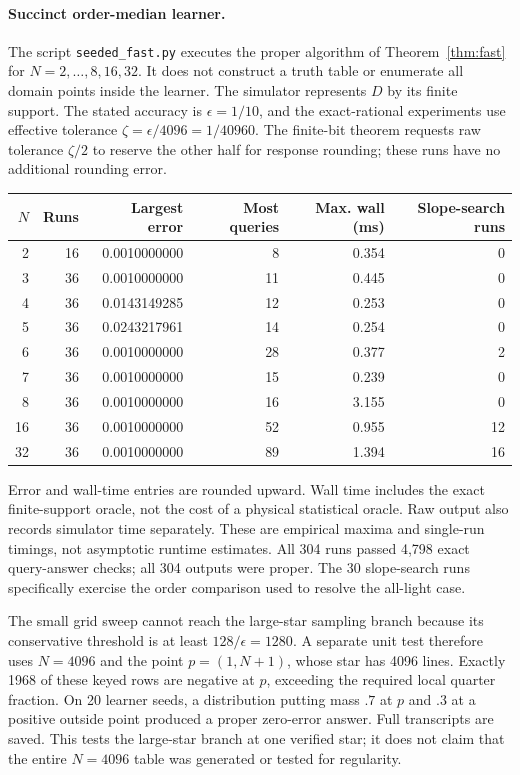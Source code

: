 \paragraph{Succinct order-median learner.}
The script \texttt{seeded\_fast.py} executes the proper algorithm of Theorem~\ref{thm:fast} for $N=2,\ldots,8,16,32$. It does not construct a truth table or enumerate all domain points inside the learner. The simulator represents $D$ by its finite support. The stated accuracy is $\epsilon=1/10$, and the exact-rational experiments use effective tolerance $\zeta=\epsilon/4096=1/40960$. The finite-bit theorem requests raw tolerance $\zeta/2$ to reserve the other half for response rounding; these runs have no additional rounding error.

\begin{center}\small
\begin{tabular}{rrrrrr}
\toprule
$N$&Runs&Largest error&Most queries&Max. wall (ms)&Slope-search runs\\
\midrule
2&16&0.0010000000&8&0.354&0\\
3&36&0.0010000000&11&0.445&0\\
4&36&0.0143149285&12&0.253&0\\
5&36&0.0243217961&14&0.254&0\\
6&36&0.0010000000&28&0.377&2\\
7&36&0.0010000000&15&0.239&0\\
8&36&0.0010000000&16&3.155&0\\
16&36&0.0010000000&52&0.955&12\\
32&36&0.0010000000&89&1.394&16\\
\bottomrule
\end{tabular}
\end{center}
Error and wall-time entries are rounded upward. Wall time includes the exact finite-support oracle, not the cost of a physical statistical oracle. Raw output also records simulator time separately. These are empirical maxima and single-run timings, not asymptotic runtime estimates. All 304 runs passed 4,798 exact query-answer checks; all 304 outputs were proper. The 30 slope-search runs specifically exercise the order comparison used to resolve the all-light case.

The small grid sweep cannot reach the large-star sampling branch because its conservative threshold is at least $128/\epsilon=1280$. A separate unit test therefore uses $N=4096$ and the point $p=(1,N+1)$, whose star has 4096 lines. Exactly 1968 of these keyed rows are negative at $p$, exceeding the required local quarter fraction. On 20 learner seeds, a distribution putting mass $.7$ at $p$ and $.3$ at a positive outside point produced a proper zero-error answer. Full transcripts are saved. This tests the large-star branch at one verified star; it does not claim that the entire $N=4096$ table was generated or tested for regularity.

